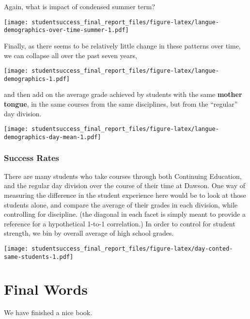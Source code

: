 \documentclass[]{book}
\theoremstyle{definition}
\theoremstyle{definition}
\theoremstyle{remark}
\begin{document}
Again, what is impact of condensed summer term?

\texttt{[image: studentsuccess\_final\_report\_files/figure-latex/langue-demographics-over-time-summer-1.pdf]}

Finally, as there seems to be relatively little change in these patterns
over time, we can collapse all over the past seven years,

\texttt{[image: studentsuccess\_final\_report\_files/figure-latex/langue-demographics-1.pdf]}

and then add on the average grade achieved by students with the same
\textbf{mother tongue}, in the same courses from the same disciplines,
but from the ``regular'' day division.

\texttt{[image: studentsuccess\_final\_report\_files/figure-latex/langue-demographics-day-mean-1.pdf]}

\subsection{Success Rates}\label{success-rates}

There are many students who take courses through both Continuing
Education, and the regular day division over the course of their time at
Dawson. One way of measuring the difference in the student experience
here would be to look at those students alone, and compare the average
of their grades in each division, while controlling for discipline. (the
diagonal in each facet is simply meant to provide a reference for a
hypothetical 1-to-1 correlation.) In order to control for student
strength, we bin by overall average of high school grades.

\texttt{[image: studentsuccess\_final\_report\_files/figure-latex/day-conted-same-students-1.pdf]}

\chapter{Final Words}\label{final-words}

We have finished a nice book.


\end{document}
